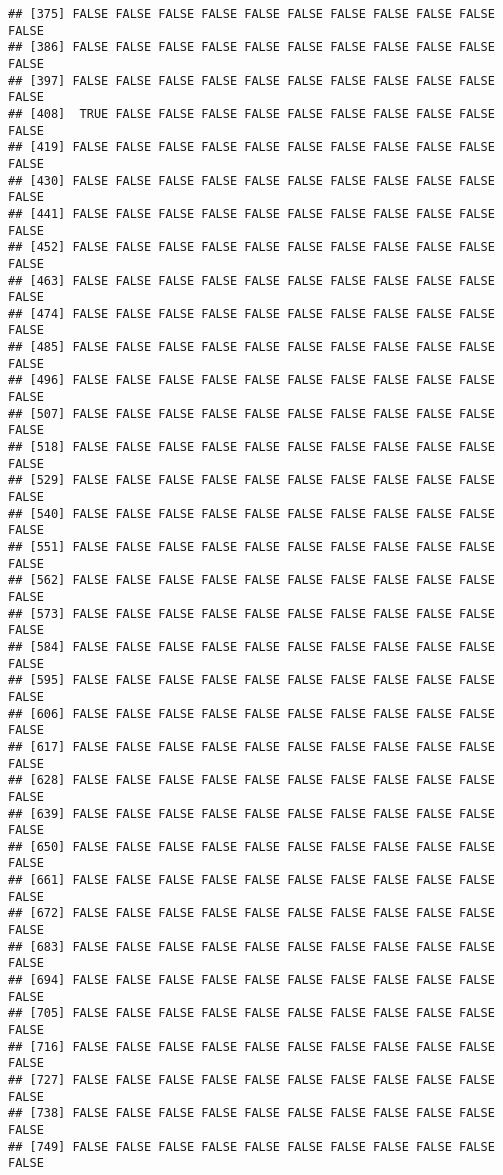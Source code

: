 \documentclass[]{article}
\begin{document}
\begin{verbatim}
## [375] FALSE FALSE FALSE FALSE FALSE FALSE FALSE FALSE FALSE FALSE FALSE
## [386] FALSE FALSE FALSE FALSE FALSE FALSE FALSE FALSE FALSE FALSE FALSE
## [397] FALSE FALSE FALSE FALSE FALSE FALSE FALSE FALSE FALSE FALSE FALSE
## [408]  TRUE FALSE FALSE FALSE FALSE FALSE FALSE FALSE FALSE FALSE FALSE
## [419] FALSE FALSE FALSE FALSE FALSE FALSE FALSE FALSE FALSE FALSE FALSE
## [430] FALSE FALSE FALSE FALSE FALSE FALSE FALSE FALSE FALSE FALSE FALSE
## [441] FALSE FALSE FALSE FALSE FALSE FALSE FALSE FALSE FALSE FALSE FALSE
## [452] FALSE FALSE FALSE FALSE FALSE FALSE FALSE FALSE FALSE FALSE FALSE
## [463] FALSE FALSE FALSE FALSE FALSE FALSE FALSE FALSE FALSE FALSE FALSE
## [474] FALSE FALSE FALSE FALSE FALSE FALSE FALSE FALSE FALSE FALSE FALSE
## [485] FALSE FALSE FALSE FALSE FALSE FALSE FALSE FALSE FALSE FALSE FALSE
## [496] FALSE FALSE FALSE FALSE FALSE FALSE FALSE FALSE FALSE FALSE FALSE
## [507] FALSE FALSE FALSE FALSE FALSE FALSE FALSE FALSE FALSE FALSE FALSE
## [518] FALSE FALSE FALSE FALSE FALSE FALSE FALSE FALSE FALSE FALSE FALSE
## [529] FALSE FALSE FALSE FALSE FALSE FALSE FALSE FALSE FALSE FALSE FALSE
## [540] FALSE FALSE FALSE FALSE FALSE FALSE FALSE FALSE FALSE FALSE FALSE
## [551] FALSE FALSE FALSE FALSE FALSE FALSE FALSE FALSE FALSE FALSE FALSE
## [562] FALSE FALSE FALSE FALSE FALSE FALSE FALSE FALSE FALSE FALSE FALSE
## [573] FALSE FALSE FALSE FALSE FALSE FALSE FALSE FALSE FALSE FALSE FALSE
## [584] FALSE FALSE FALSE FALSE FALSE FALSE FALSE FALSE FALSE FALSE FALSE
## [595] FALSE FALSE FALSE FALSE FALSE FALSE FALSE FALSE FALSE FALSE FALSE
## [606] FALSE FALSE FALSE FALSE FALSE FALSE FALSE FALSE FALSE FALSE FALSE
## [617] FALSE FALSE FALSE FALSE FALSE FALSE FALSE FALSE FALSE FALSE FALSE
## [628] FALSE FALSE FALSE FALSE FALSE FALSE FALSE FALSE FALSE FALSE FALSE
## [639] FALSE FALSE FALSE FALSE FALSE FALSE FALSE FALSE FALSE FALSE FALSE
## [650] FALSE FALSE FALSE FALSE FALSE FALSE FALSE FALSE FALSE FALSE FALSE
## [661] FALSE FALSE FALSE FALSE FALSE FALSE FALSE FALSE FALSE FALSE FALSE
## [672] FALSE FALSE FALSE FALSE FALSE FALSE FALSE FALSE FALSE FALSE FALSE
## [683] FALSE FALSE FALSE FALSE FALSE FALSE FALSE FALSE FALSE FALSE FALSE
## [694] FALSE FALSE FALSE FALSE FALSE FALSE FALSE FALSE FALSE FALSE FALSE
## [705] FALSE FALSE FALSE FALSE FALSE FALSE FALSE FALSE FALSE FALSE FALSE
## [716] FALSE FALSE FALSE FALSE FALSE FALSE FALSE FALSE FALSE FALSE FALSE
## [727] FALSE FALSE FALSE FALSE FALSE FALSE FALSE FALSE FALSE FALSE FALSE
## [738] FALSE FALSE FALSE FALSE FALSE FALSE FALSE FALSE FALSE FALSE FALSE
## [749] FALSE FALSE FALSE FALSE FALSE FALSE FALSE FALSE FALSE FALSE FALSE

\end{verbatim}
\end{document}
